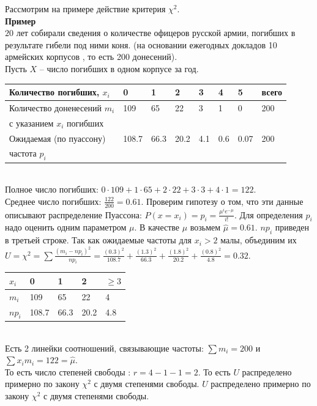 \documentclass[russian, 12pt, fleqn,x11names]{article}
\begin{document}
Рассмотрим на примере действие критерия $\chi^2$.\\
\textbf{Пример}\\
$20$ лет собирали сведения о количестве офицеров русской армии, погибших в результате гибели под ними коня. (на основании ежегодных докладов 10 армейских корпусов , то есть 200 донесений).\\
Пусть $X$ -- число погибших в одном корпусе за год.\\
\begin{tabular}[b]{ | l |  l | l |  l |   l |   l |   l |   l |     }
\hline
Количество погибших, $x_i$ &0&1&2&3&4&5& всего\\
\hline
Количество доненесений $m_i$ &109&65&22&3&1&0&200\\
с указанием $x_i$ погибших& &  & & & & &\\
\hline
Ожидаемая (по пуассону)& 108.7&66.3&20.2&4.1&0.6&0.07&200\\
частота $p_i$& & & & & & & \\
\hline
\end{tabular}\\
Полное число погибших: $0\cdot 109 + 1 \cdot 65 + 2 \cdot 22 + 3 \cdot 3 + 4 \cdot 1=122$.\\
Среднее число погибших: $\frac{122}{200} = 0.61$. Проверим гипотезу о том, что эти данные описывают распределение Пуассона: $P(x = x_i) = p_i = \frac{\mu^ie^{-\mu}}{i!}$. Для определения $p_i$ надо оценить одним параметром $\mu$. В качестве $\mu$ возьмем $\hat{\mu} = 0.61$. $np_i$ приведен в третьей строке. Так как ожидаемые частоты для $x_i > 2$ малы, объединим их $U = \chi^2 = \displaystyle{\sum } \frac{(m_i - np_i)^2}{np_i} = \frac{(0.3)^2}{108.7} + \frac{(1.3)^2}{66.3} + \frac{(1.8)^2}{20.2} + \frac{(0.8)^2}{4.8} = 0.32$. \\
\begin{tabular}[b]{ | l |  l | l |  l |   l |     }
\hline
$x_i$&0&1&2&$\geq 3$\\
\hline
$m_i$&109&65&22&4\\
\hline
$np_i$&108.7&66.3&20.2&4.8\\
\hline
\end{tabular}\\
Есть 2 линейки соотношений, связывающие частоты: $\displaystyle{\sum\limits} m_i = 200$ и $\displaystyle{\sum\limits} x_im_i = 122 = \hat{\mu}$.\\
То есть число степеней свободы : $r = 4 - 1 - 1 = 2$. То есть $U$ распределено примерно  по закону $\chi^2$ с двумя степенями свободы. $U$ распределено примерно по закону $\chi^2$ с двумя степенями свободы.\\
\end{document}
